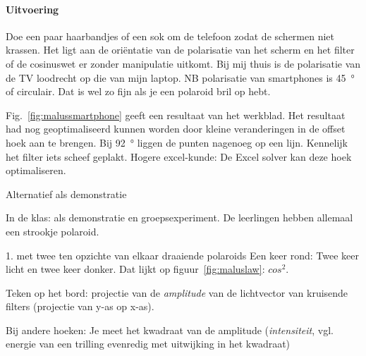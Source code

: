 \documentclass[../../main.tex]{subfiles}
\begin{document}
\paragraph{Uitvoering}
Doe een paar haarbandjes of een sok om de telefoon zodat de schermen niet krassen. 
Het ligt aan de ori\"entatie van de polarisatie van het scherm en het filter of de cosinuswet er zonder manipulatie uitkomt. Bij mij thuis is de polarisatie van de TV loodrecht op die van mijn laptop. NB polarisatie van smartphones is \SI{45}{\degree} of circulair. Dat is wel zo fijn als je een polaroid bril op hebt.

Fig.~\ref{fig:malussmartphone} geeft een resultaat van het werkblad. Het resultaat had nog geoptimaliseerd kunnen worden door kleine veranderingen in de offset hoek aan te brengen. Bij \SI{92}{\degree} liggen de punten nagenoeg op een lijn. Kennelijk het filter iets scheef geplakt. Hogere excel-kunde: De Excel solver kan deze hoek optimaliseren.


Alternatief als demonstratie

In de klas: als demonstratie en groepsexperiment. De leerlingen hebben allemaal een strookje polaroid.

1. met twee ten opzichte van elkaar draaiende polaroids Een keer rond: Twee keer licht en twee keer donker. Dat lijkt op figuur~\ref{fig:maluslaw}: $cos^2$. 

Teken op het bord: projectie van de \textit{amplitude} van de lichtvector van kruisende filters (projectie van y-as op x-as). 

Bij andere hoeken: Je meet het kwadraat van de amplitude (\textit{intensiteit}, vgl. energie van een trilling evenredig met uitwijking in het kwadraat)
\end{document}
